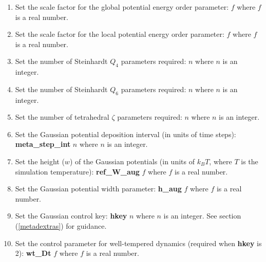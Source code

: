 \begin{enumerate}
\begin{enumerate}
\item Set the scale factor for the global potential energy order parameter:
   $f$ \newline where $f$ is a real number.
\item Set the scale factor for the local potential energy order parameter:
   $f$ \newline where $f$ is a real number.
\item Set the number of Steinhardt $Q_{4}$ parameters required:
   $n$ \newline where $n$ is an integer.
\item Set the number of Steinhardt $Q_{6}$ parameters required:
   $n$ \newline where $n$ is an integer.
\item Set the number of tetrahedral $\zeta$ parameters required:
   $n$ \newline where $n$ is an integer.
\item Set the Gaussian potential deposition interval (in units of time steps): \newline
  {\bf meta\_step\_int} $n$ \newline where $n$ is an integer.
\item Set the height ($w$) of the Gaussian potentials (in units of $k_{B}T$,
  where $T$ is the simulation temperature): \newline
  {\bf ref\_W\_aug} $f$ \newline where $f$ is a real number.
\item Set the Gaussian potential width parameter: \newline
  {\bf h\_aug} $f$ \newline where $f$ is a real number.
\item Set the Gaussian control key: \newline
  {\bf hkey} $n$ \newline where $n$ is an integer. See section
  (\ref{metadextras}) for guidance.
\item Set the control parameter for well-tempered dynamics
  (required when {\bf hkey} is 2): \newline 
  {\bf wt\_Dt} $f$ \newline where $f$ is a real number.

\end{enumerate}
\end{enumerate}
